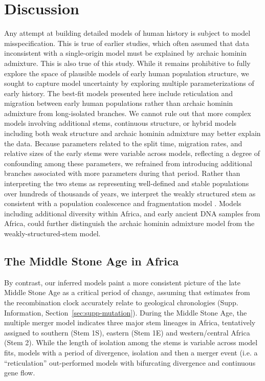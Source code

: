\documentclass[]{article}
\begin{document}
\section*{Discussion}

Any attempt at building detailed models of human history is subject to model
misspecification. This is true of earlier studies, which often assumed that
data inconsistent with a single-origin model must be explained by archaic
hominin admixture. This is also true of this study. While it remains
prohibitive to fully explore the space of plausible models of early human
population structure, we sought to capture model uncertainty by exploring
multiple parameterizations of early history. The best-fit models presented
here include reticulation and migration between early human populations rather
than archaic hominin admixture from long-isolated branches. We cannot rule out
that more complex models involving additional stems, continuous structure, or
hybrid models including both weak structure and archaic hominin admixture may
better explain the data. Because parameters related to the split time,
migration rates, and relative sizes of the early stems were variable across
models, reflecting a degree of confounding among these parameters, we refrained
from introducing additional branches associated with more parameters during
that period.  Rather than interpreting the two stems as representing
well-defined and stable populations over hundreds of thousands of years, we
interpret the weakly structured stem as consistent with a population
coalescence and fragmentation model \citep{Scerri2019-xg}. Models including
additional diversity within Africa, and early ancient DNA samples from Africa,
could further distinguish the archaic hominin admixture model from the
weakly-structured-stem model.

\subsection*{The Middle Stone Age in Africa}

By contrast, our inferred models paint a more consistent picture of the late
Middle Stone Age as a critical period of change, assuming that estimates from
the recombination clock accurately relate to geological chronologies
(Supp. Information, Section~\ref{sec:supp-mutation}).
During the Middle Stone Age, the multiple merger model indicates three
major stem lineages in Africa, tentatively assigned to southern (Stem 1S),
eastern (Stem 1E) and western/central Africa (Stem 2). While the length of
isolation among the stems is variable across model fits, models with a period of 
divergence, isolation and then a merger event (i.e. a ``reticulation''
out-performed models with bifurcating divergence and continuous gene flow. 
\end{document}
